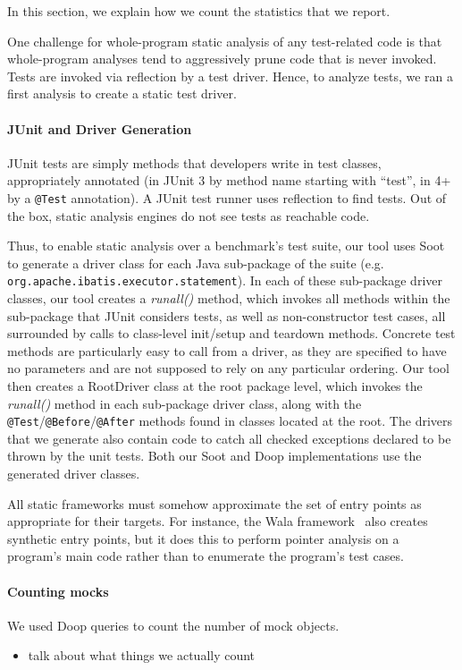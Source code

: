 In this section, we explain how we count the statistics that we report.

One challenge for whole-program static analysis of any test-related code is that whole-program
analyses tend to aggressively prune code that is never invoked. Tests are invoked via reflection
by a test driver. Hence, to analyze tests, we ran a first analysis to create a static test driver.

\paragraph{JUnit and Driver Generation}
JUnit tests are simply methods that developers write in test classes, appropriately annotated (in JUnit 3 by method name starting with ``test'', in 4+ by a \texttt{@Test} annotation). A JUnit test runner uses reflection to find tests. Out of the box, static analysis engines do not see tests as reachable code.


Thus, to enable static analysis over a benchmark's test suite, our tool uses Soot to generate a driver class for each Java sub-package of the suite (e.g. \texttt{org.apache.ibatis.executor.statement}). In each of these sub-package driver classes, our tool creates a \textit{runall()} method, which invokes all methods within the sub-package that JUnit considers tests, as well as non-constructor test cases, all surrounded by calls to class-level init/setup and teardown methods. Concrete test methods are particularly easy to call from a driver, as they are specified to have no parameters and are not supposed to rely on any particular ordering. 
Our tool then creates a RootDriver class at the root package level, which invokes the \textit{runall()} method in each sub-package driver class, along with the \texttt{@Test}/\texttt{@Before}/\texttt{@After} methods found in classes located at the root. The drivers that we generate also contain code to catch all checked exceptions declared to be thrown by the unit tests. Both our Soot and Doop implementations use the generated driver classes.

All static frameworks must somehow approximate the set of entry points as appropriate for their targets. For instance, the Wala framework~\cite{wala19:_t} also creates synthetic entry points, but it does this to perform pointer analysis on a program's main code rather than to enumerate the program's test cases.

\paragraph{Counting mocks}
We used Doop queries to count the number of mock objects.
\begin{itemize}
\item talk about what things we actually count
\end{itemize}

